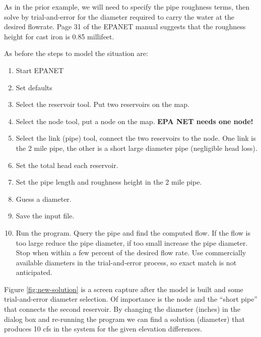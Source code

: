 As in the prior example, we will need to specify the pipe roughness terms, then solve by trial-and-error for the diameter required to carry the water at the desired flowrate.  Page 31 of the EPANET manual suggests that the roughness height for cast iron is 0.85 millifeet.  

As before the steps to model the situation are:
\begin{enumerate}
\item Start EPANET
\item Set defaults
\item Select the reservoir tool.  Put two reservoirs on the map.
\item Select the node tool, put a node on the map. \textbf{EPA NET needs one node!}
\item Select the link (pipe) tool, connect the two reservoirs to the node.  One link is the 2 mile pipe, the other is a short large diameter pipe (negligible head loss).
\item Set the total head each reservoir.
\item Set the pipe length and roughness height in the 2 mile pipe.
\item Guess a diameter.
\item Save the input file.
\item Run the program.   Query the pipe and find the computed flow.  If the flow is too large reduce the pipe diameter, if too small increase the pipe diameter.  Stop when within a few percent of the desired flow rate.  Use commercially available diameters in the trial-and-error process, so exact match is not anticipated.
\end{enumerate}

Figure \ref{fig:new-solution} is a screen capture after the model is built and some trial-and-error diameter selection.   Of importance is the node and the ``short pipe'' that connects the second reservoir.   By changing the diameter (inches) in the dialog box and re-running the program we can find a solution (diameter) that produces 10 cfs in the system for the given elevation differences.  

